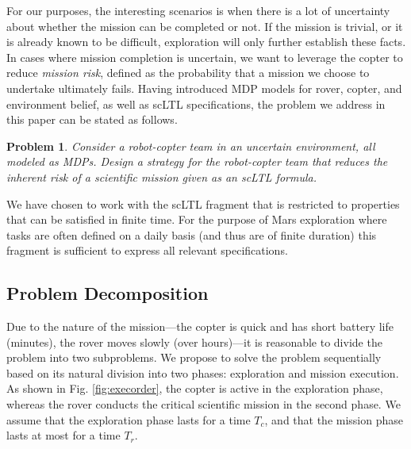\documentclass[conference]{IEEEtran}
\newtheorem{problem}{Problem}
\begin{document}
For our purposes, the interesting scenarios is when there is a lot of uncertainty about whether the mission can be completed or not. If the mission is trivial, or it is already known to be difficult, exploration will only further establish these facts. In cases where mission completion is uncertain, we want to leverage the copter to reduce \emph{mission risk}, defined as the probability that a mission we choose to undertake ultimately fails. Having introduced MDP models for rover, copter, and environment belief, as well as scLTL specifications, the problem we address in this paper can be stated as follows.

\begin{problem}
\label{prob:basic}
Consider a robot-copter team in an uncertain environment, all modeled as MDPs. Design a strategy for the robot-copter team that reduces the inherent risk of a scientific mission given as an scLTL formula.
\end{problem}

We have chosen to work with the scLTL fragment that is restricted to properties that can be satisfied in finite time. For the purpose of Mars exploration where tasks are often defined on a daily basis (and thus are of finite duration) this fragment is sufficient to express all relevant specifications.

\subsection{Problem Decomposition}

Due to the nature of the mission---the copter is quick and has short battery life (minutes), the rover moves slowly (over hours)---it is reasonable to divide the problem into two subproblems. We propose to solve the problem sequentially based on its natural division into two phases: exploration and mission execution. As shown in Fig. \ref{fig:execorder}, the copter is active in the exploration phase, whereas the rover conducts the critical scientific mission in the second phase. We assume that the exploration phase lasts for a time $T_c$, and that the mission phase lasts at most for a time $T_r$.
\end{document}
